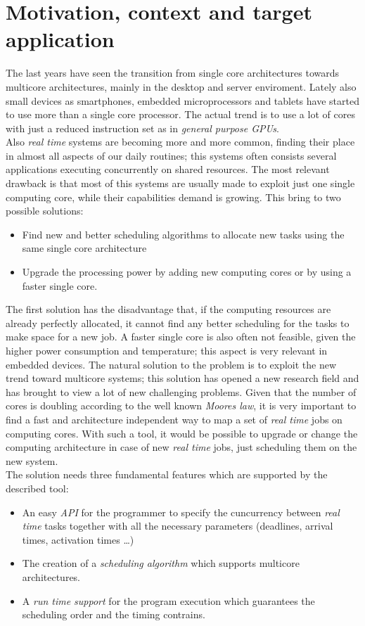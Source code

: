 \documentclass[a4paper,11pt,oneside]{book}
\begin{document}
\section{Motivation, context and target application}
The last years have seen the transition from single core architectures towards multicore architectures, mainly in the desktop and server enviroment. Lately also small devices as smartphones, embedded microprocessors and tablets have started to use more than a single core processor. The actual trend is to use a lot of cores with just a reduced instruction set as in \emph{general purpose GPUs}.\\
Also \emph{real time} systems are becoming more and more common, finding their place in almost all aspects of our daily routines; this systems often consists several applications executing concurrently on shared resources. The most relevant drawback is that most of this systems are usually made to exploit just one single computing core, while their capabilities demand is growing. This bring to two possible solutions:
\begin{itemize}
\item{Find new and better scheduling algorithms to allocate new tasks using the same single core architecture}
\item{Upgrade the processing power by adding new computing cores or by using a faster single core.}
\end{itemize}
The first solution has the disadvantage that, if the computing resources are already perfectly allocated, it cannot find any better scheduling for the tasks to make space for a new job. A faster single core is also often not feasible, given the higher power consumption and temperature; this aspect is very relevant in embedded devices. 
The natural solution to the problem is to exploit the new trend toward multicore systems; this solution has opened a new research field and has brought to view a lot of new challenging problems. Given that the number of cores is doubling according to the well known \emph{Moores law}, it is very important to find a fast and architecture independent way to map a set of \emph{real time} jobs on computing cores. With such a tool, it would be possible to upgrade or change the computing architecture in case of new \emph{real time} jobs, just scheduling them on the new system.\\
 The solution needs three fundamental features which are supported by the described tool:
\begin{itemize}
\item{An easy \emph{API} for the programmer to specify the cuncurrency between \emph{real time} tasks together with all the necessary parameters (deadlines, arrival times, activation times \dots)}
\item{The creation of a \emph{scheduling algorithm} which supports multicore architectures. }
\item{A \emph{run time support} for the program execution which guarantees the scheduling order and the timing contrains.}
\end{itemize}
\end{document}
